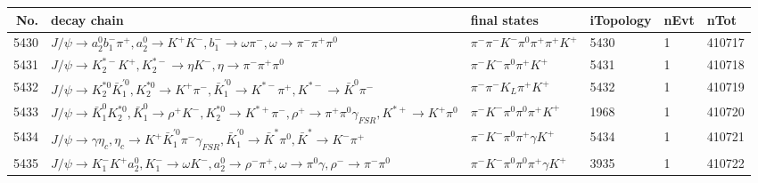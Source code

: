 \begin{table}[htbp] 
\begin{center}
\begin{small}
\begin{tabular}{rlllll}\hline\hline
 No. & decay chain & final states &  iTopology & nEvt & nTot \\\hline
5430&$J/\psi       \rightarrow a_{2}^{0}      b_{1}^{-}      \pi^{+}        , a_{2}^{0}       \rightarrow K^{+}          K^{-}          , b_{1}^{-}       \rightarrow \omega         \pi^{-}        , \omega          \rightarrow \pi^{-}        \pi^{+}        \pi^{0}        $&$\pi^{-}        \pi^{-}        K^{-}          \pi^{0}        \pi^{+}        \pi^{+}        K^{+}          $& 5430&    1&410717\\
5431&$J/\psi       \rightarrow K_2^{*-}       K^{+}          , K_2^{*-}        \rightarrow \eta          K^{-}          , \eta           \rightarrow \pi^{-}        \pi^{+}        \pi^{0}        $&$\pi^{-}        K^{-}          \pi^{0}        \pi^{+}        K^{+}          $& 5431&    1&410718\\
5432&$J/\psi       \rightarrow K_2^{*0}       \bar{K}_1^{'0}, K_2^{*0}        \rightarrow K^{+}          \pi^{-}        , \bar{K}_1^{'0} \rightarrow K^{*-}         \pi^{+}        , K^{*-}          \rightarrow \bar{K}^{0}   \pi^{-}        $&$\pi^{-}        \pi^{-}        K_{L}          \pi^{+}        K^{+}          $& 5432&    1&410719\\
5433&$J/\psi       \rightarrow \bar{K}_1^{0} K_2^{*0}       , \bar{K}_1^{0}  \rightarrow \rho^{+}      K^{-}          , K_2^{*0}        \rightarrow K^{*+}         \pi^{-}        , \rho^{+}       \rightarrow \pi^{+}        \pi^{0}        \gamma_{FSR} , K^{*+}          \rightarrow K^{+}          \pi^{0}        $&$\pi^{-}        K^{-}          \pi^{0}        \pi^{0}        \pi^{+}        K^{+}          $& 1968&    1&410720\\
5434&$J/\psi       \rightarrow \gamma       \eta_{c}    , \eta_{c}     \rightarrow K^{+}          \bar{K}_1^{'0}\pi^{-}        \gamma_{FSR} , \bar{K}_1^{'0} \rightarrow \bar{K}^{*}   \pi^{0}        , \bar{K}^{*}    \rightarrow K^{-}          \pi^{+}        $&$\pi^{-}        K^{-}          \pi^{0}        \pi^{+}        \gamma       K^{+}          $& 5434&    1&410721\\
5435&$J/\psi       \rightarrow K_{1}^{-}      K^{+}          a_{2}^{0}      , K_{1}^{-}       \rightarrow \omega         K^{-}          , a_{2}^{0}       \rightarrow \rho^{-}      \pi^{+}        , \omega          \rightarrow \pi^{0}        \gamma       , \rho^{-}       \rightarrow \pi^{-}        \pi^{0}        $&$\pi^{-}        K^{-}          \pi^{0}        \pi^{0}        \pi^{+}        \gamma       K^{+}          $& 3935&    1&410722\\

\end{tabular}
\end{small}
\end{center}
\end{table}
